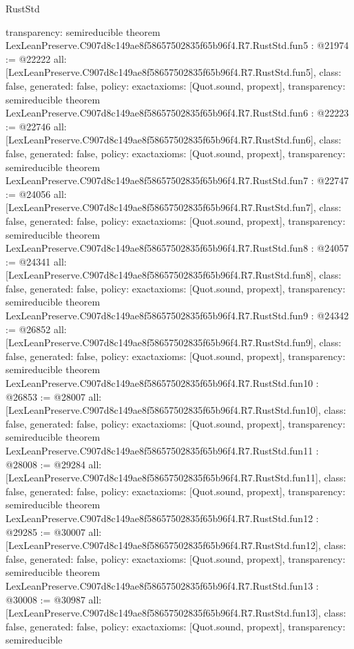 \begin{lexlean}{RustStd}
\begin{coremodule}
{  transparency: semireducible
}
theorem LexLeanPreserve.C907d8c149ae8f58657502835f65b96f4.R7.RustStd.fun5 : @21974 := @22222 {
  all: [LexLeanPreserve.C907d8c149ae8f58657502835f65b96f4.R7.RustStd.fun5],
  class: false,
  generated: false,
  policy: exact{axioms: [Quot.sound, propext]},
  transparency: semireducible
}
theorem LexLeanPreserve.C907d8c149ae8f58657502835f65b96f4.R7.RustStd.fun6 : @22223 := @22746 {
  all: [LexLeanPreserve.C907d8c149ae8f58657502835f65b96f4.R7.RustStd.fun6],
  class: false,
  generated: false,
  policy: exact{axioms: [Quot.sound, propext]},
  transparency: semireducible
}
theorem LexLeanPreserve.C907d8c149ae8f58657502835f65b96f4.R7.RustStd.fun7 : @22747 := @24056 {
  all: [LexLeanPreserve.C907d8c149ae8f58657502835f65b96f4.R7.RustStd.fun7],
  class: false,
  generated: false,
  policy: exact{axioms: [Quot.sound, propext]},
  transparency: semireducible
}
theorem LexLeanPreserve.C907d8c149ae8f58657502835f65b96f4.R7.RustStd.fun8 : @24057 := @24341 {
  all: [LexLeanPreserve.C907d8c149ae8f58657502835f65b96f4.R7.RustStd.fun8],
  class: false,
  generated: false,
  policy: exact{axioms: [Quot.sound, propext]},
  transparency: semireducible
}
theorem LexLeanPreserve.C907d8c149ae8f58657502835f65b96f4.R7.RustStd.fun9 : @24342 := @26852 {
  all: [LexLeanPreserve.C907d8c149ae8f58657502835f65b96f4.R7.RustStd.fun9],
  class: false,
  generated: false,
  policy: exact{axioms: [Quot.sound, propext]},
  transparency: semireducible
}
theorem LexLeanPreserve.C907d8c149ae8f58657502835f65b96f4.R7.RustStd.fun10 : @26853 := @28007 {
  all: [LexLeanPreserve.C907d8c149ae8f58657502835f65b96f4.R7.RustStd.fun10],
  class: false,
  generated: false,
  policy: exact{axioms: [Quot.sound, propext]},
  transparency: semireducible
}
theorem LexLeanPreserve.C907d8c149ae8f58657502835f65b96f4.R7.RustStd.fun11 : @28008 := @29284 {
  all: [LexLeanPreserve.C907d8c149ae8f58657502835f65b96f4.R7.RustStd.fun11],
  class: false,
  generated: false,
  policy: exact{axioms: [Quot.sound, propext]},
  transparency: semireducible
}
theorem LexLeanPreserve.C907d8c149ae8f58657502835f65b96f4.R7.RustStd.fun12 : @29285 := @30007 {
  all: [LexLeanPreserve.C907d8c149ae8f58657502835f65b96f4.R7.RustStd.fun12],
  class: false,
  generated: false,
  policy: exact{axioms: [Quot.sound, propext]},
  transparency: semireducible
}
theorem LexLeanPreserve.C907d8c149ae8f58657502835f65b96f4.R7.RustStd.fun13 : @30008 := @30987 {
  all: [LexLeanPreserve.C907d8c149ae8f58657502835f65b96f4.R7.RustStd.fun13],
  class: false,
  generated: false,
  policy: exact{axioms: [Quot.sound, propext]},
  transparency: semireducible
}
\end{coremodule}
\end{lexlean}
